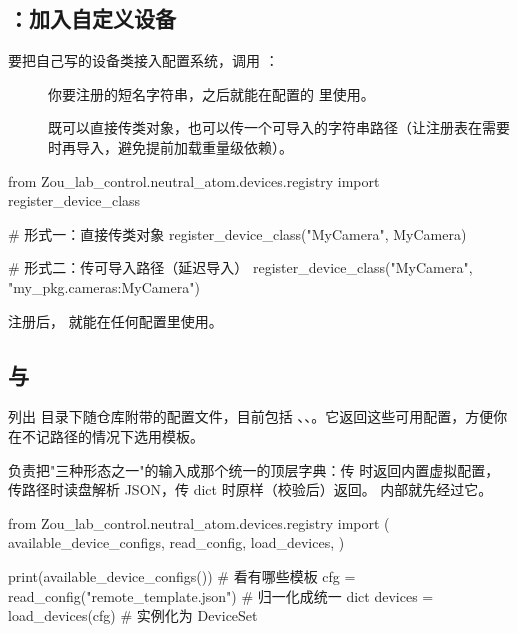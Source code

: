 \documentclass[11pt,oneside,openany]{book}
\begin{document}
\subsection{：加入自定义设备}

要把自己写的设备类接入配置系统，调用 ：

\begin{description}
\item[] 你要注册的短名字符串，之后就能在配置的  里使用。
\item[] 既可以直接传类对象，也可以传一个可导入的字符串路径（让注册表在需要时再导入，避免提前加载重量级依赖）。
\end{description}

\begin{codeblock}[Python]
from Zou_lab_control.neutral_atom.devices.registry import register_device_class

# 形式一：直接传类对象
register_device_class("MyCamera", MyCamera)

# 形式二：传可导入路径（延迟导入）
register_device_class("MyCamera", "my_pkg.cameras:MyCamera")
\end{codeblock}

注册后， 就能在任何配置里使用。

\subsection{ 与 }

 列出  目录下随仓库附带的配置文件，目前包括 、、。它返回这些可用配置，方便你在不记路径的情况下选用模板。

 负责把"三种形态之一"的输入成那个统一的顶层字典：传  时返回内置虚拟配置，传路径时读盘解析 JSON，传 dict 时原样（校验后）返回。 内部就先经过它。

\begin{codeblock}[Python]
from Zou_lab_control.neutral_atom.devices.registry import (
    available_device_configs, read_config, load_devices,
)

print(available_device_configs())          # 看有哪些模板
cfg = read_config("remote_template.json")   # 归一化成统一 dict
devices = load_devices(cfg)                 # 实例化为 DeviceSet
\end{codeblock}
\end{document}
